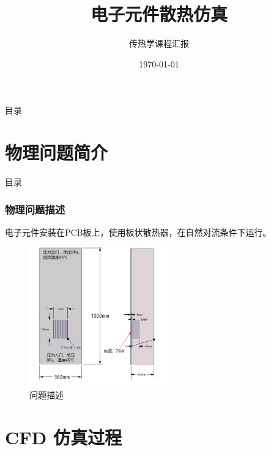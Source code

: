 \documentclass[UTF8,9pt]{ctexbeamer}
\begin{document}
\title{{电子元件散热仿真}\\\vspace{1em}}

\subtitle{传热学课程汇报}

\author{}

\institute{}

\date{\today}

\frame{\titlepage}

\begin{frame}{目录}

\tableofcontents

\end{frame}

\section{物理问题简介}

\begin{frame}{目录}

\tableofcontents[currentsection]

\end{frame}

\begin{frame}

\frametitle{物理问题描述}
%
电子元件安装在PCB板上，使用板状散热器，在自然对流条件下运行。
\\

\begin{figure}
    \includegraphics[height=6cm]{figure2.png}
    \caption{问题描述}
\end{figure}
%

%
\end{frame}


\section{CFD 仿真过程}
\end{document}
